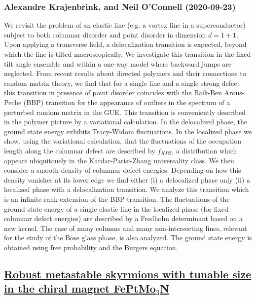 \subsubsection*{Alexandre Krajenbrink, and Neil O'Connell (2020-09-23)}
We revisit the problem of an elastic line (e.g. a vortex line in a
superconductor) subject to both columnar disorder and point disorder in
dimension $d=1+1$. Upon applying a transverse field, a delocalization
transition is expected, beyond which the line is tilted macroscopically. We
investigate this transition in the fixed tilt angle ensemble and within a
one-way model where backward jumps are neglected. From recent results about
directed polymers and their connections to random matrix theory, we find that
for a single line and a single strong defect this transition in presence of
point disorder coincides with the Baik-Ben Arous-Peche (BBP) transition for the
appearance of outliers in the spectrum of a perturbed random matrix in the GUE.
This transition is conveniently described in the polymer picture by a
variational calculation. In the delocalized phase, the ground state energy
exhibits Tracy-Widom fluctuations. In the localized phase we show, using the
variational calculation, that the fluctuations of the occupation length along
the columnar defect are described by $f_{KPZ}$, a distribution which appears
ubiquitously in the Kardar-Parisi-Zhang universality class. We then consider a
smooth density of columnar defect energies. Depending on how this density
vanishes at its lower edge we find either (i) a delocalized phase only (ii) a
localized phase with a delocalization transition. We analyze this transition
which is an infinite-rank extension of the BBP transition. The fluctuations of
the ground state energy of a single elastic line in the localized phase (for
fixed columnar defect energies) are described by a Fredholm determinant based
on a new kernel. The case of many columns and many non-intersecting lines,
relevant for the study of the Bose glass phase, is also analyzed. The ground
state energy is obtained using free probability and the Burgers equation.

\subsection*{\href{http://arxiv.org/abs/2009.11283v1}{Robust metastable skyrmions with tunable size in the chiral magnet  FePtMo$_3$N}}
